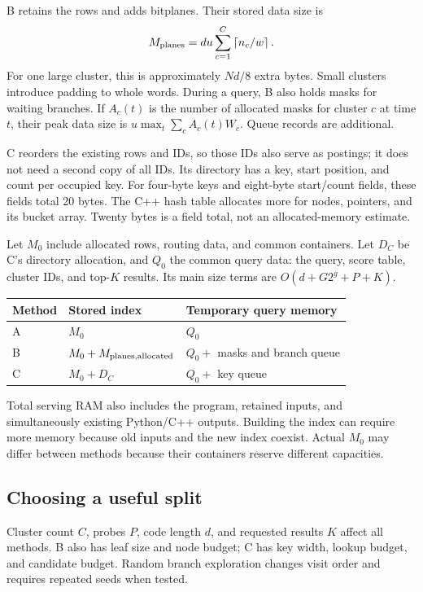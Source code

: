 \documentclass[11pt,a4paper]{article}
\newcommand{\ceil}[1]{\left\lceil #1\right\rceil}
\begin{document}
B retains the rows and adds bitplanes. Their stored data size is
\begin{equation}
 M_{\rm planes}=du\sum_{c=1}^{C}\ceil{n_c/w}.
\end{equation}
For one large cluster, this is approximately $Nd/8$ extra bytes. Small clusters introduce
padding to whole words. During a query, B also holds masks for waiting branches. If
$A_c(t)$ is the number of allocated masks for cluster $c$ at time $t$, their peak data size is
$u\max_t\sum_c A_c(t)W_c$. Queue records are additional.

C reorders the existing rows and IDs, so those IDs also serve as postings; it does not need
a second copy of all IDs. Its directory has a key, start position, and count per occupied
key. For four-byte keys and eight-byte start/count fields, these fields total 20 bytes.
The C++ hash table allocates more for nodes, pointers, and its bucket array. Twenty bytes is
a field total, not an allocated-memory estimate.

Let $M_0$ include allocated rows, routing data, and common containers. Let $D_C$ be C's
directory allocation, and $Q_0$ the common query data: the query, score table, cluster IDs,
and top-$K$ results. Its main size terms are $O(d+G2^g+P+K)$.
\begin{center}
\begin{tabular}{@{}lll@{}}\toprule
Method & Stored index & Temporary query memory\\\midrule
A & $M_0$ & $Q_0$\\
B & $M_0+M_{\rm planes,allocated}$ & $Q_0+$ masks and branch queue\\
C & $M_0+D_C$ & $Q_0+$ key queue\\\bottomrule
\end{tabular}
\end{center}
Total serving RAM also includes the program, retained inputs, and simultaneously existing
Python/C++ outputs. Building the index can require more memory because old inputs and the
new index coexist. Actual $M_0$ may differ between methods because their containers reserve
different capacities.

\subsection{Choosing a useful split}
Cluster count $C$, probes $P$, code length $d$, and requested results $K$ affect all methods.
B also has leaf size and node budget; C has key width, lookup budget, and candidate budget.
Random branch exploration changes visit order and requires repeated seeds when tested.
\end{document}
